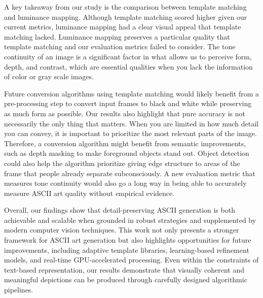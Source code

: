 \documentclass[10pt,twocolumn,letterpaper]{article}
\begin{document}
A key takeaway from our study is the comparison between template matching and luminance mapping. Although template matching scored higher given our current metrics, luminance mapping had a clear visual appeal that template matching lacked. Luminance mapping preserves a particular quality that template matching and our evaluation metrics failed to consider. The tone continuity of an image is a significant factor in what allows us to perceive form, depth, and contrast, which are essential qualities when you lack the information of color or gray scale images.

Future conversion algorithms using template matching would likely benefit from a pre-processing step to convert input frames to black and white while preserving as much form as possible. Our results also highlight that pure accuracy is not necessarily the only thing that matters. When you are limited in how much detail you can convey, it is important to prioritize the most relevant parts of the image. Therefore, a conversion algorithm might benefit from semantic improvements, such as depth masking to make foreground objects stand out. Object detection could also help the algorithm prioritize giving edge structure to areas of the frame that people already separate subconsciously. A new evaluation metric that measures tone continuity would also go a long way in being able to accurately measure ASCII art quality without empirical evidence.

Overall, our findings show that detail-preserving ASCII generation is both achievable and scalable when grounded in robust strategies and supplemented by modern computer vision techniques. This work not only presents a stronger framework for ASCII art generation but also highlights opportunities for future improvements, including adaptive template libraries, learning-based refinement models, and real-time GPU-accelerated processing. Even within the constraints of text-based representation, our results demonstrate that visually coherent and meaningful depictions can be produced through carefully designed algorithmic pipelines.





{\small


}
\end{document}
